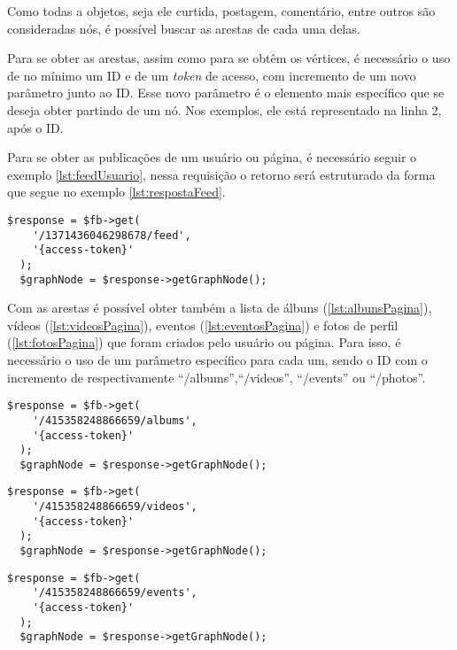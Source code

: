 Como todas a objetos, seja ele curtida, postagem, comentário, entre outros são consideradas nós, é possível buscar as arestas de cada uma delas.

Para se obter as arestas, assim como para se obtêm os vértices, é necessário o uso de no mínimo um ID e de um \textit{token} de acesso, com incremento de um novo parâmetro junto ao ID. Esse novo parâmetro é o elemento mais específico que se deseja obter partindo de um nó. Nos exemplos, ele está representado na linha 2, após o ID.

Para se obter as publicações de um usuário ou página, é necessário seguir o exemplo \ref{lst:feedUsuario}, nessa requisição o retorno será estruturado da forma que segue no exemplo \ref{lst:respostaFeed}.

\begin{lstlisting}[caption={Requisitando todas as publicações de um usuário},label={lst:feedUsuario}]
  $response = $fb->get( 
    '/1371436046298678/feed', 
    '{access-token}'
  );
  $graphNode = $response->getGraphNode();
\end{lstlisting}

Com as arestas é possível obter também a lista de álbuns (\ref{lst:albunsPagina}), vídeos (\ref{lst:videosPagina}), eventos (\ref{lst:eventosPagina}) e fotos de perfil (\ref{lst:fotosPagina}) que foram criados pelo usuário ou página. Para isso, é necessário o uso de um parâmetro específico para cada um, sendo o ID com o incremento de respectivamente ``/albums'',``/videos'', ``/events'' ou ``/photos''.
\begin{lstlisting}[caption={Requisitar todos os álbuns de uma página},label={lst:albunsPagina}]
  $response = $fb->get( 
    '/415358248866659/albums', 
    '{access-token}'
  );
  $graphNode = $response->getGraphNode();
\end{lstlisting}

\begin{lstlisting}[caption={Requisitar os vídeos publicados na página},label={lst:videosPagina}]
  $response = $fb->get( 
    '/415358248866659/videos', 
    '{access-token}'
  );
  $graphNode = $response->getGraphNode();
\end{lstlisting}

\begin{lstlisting}[caption={Requisitar os eventos agendados pela página},label={lst:eventosPagina}]
  $response = $fb->get( 
    '/415358248866659/events', 
    '{access-token}'
  );
  $graphNode = $response->getGraphNode();
\end{lstlisting}



